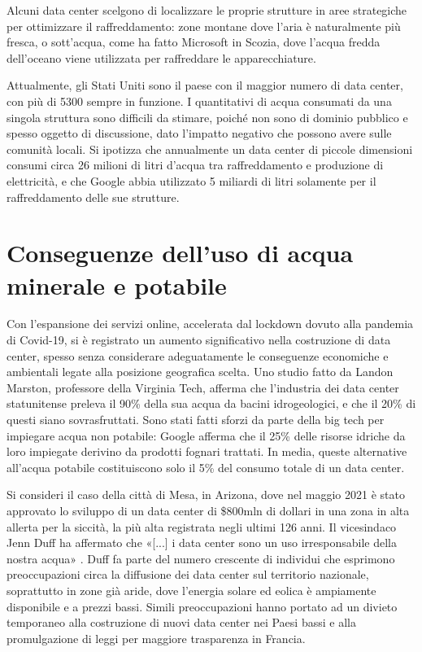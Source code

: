 \documentclass[12pt,a4paper,oneside]{book}
\begin{document}
Alcuni data center scelgono di localizzare le proprie strutture in aree strategiche per ottimizzare il raffreddamento: zone montane dove l'aria è naturalmente più fresca, o sott'acqua, come ha fatto Microsoft in Scozia, dove l'acqua fredda dell'oceano viene utilizzata per raffreddare le apparecchiature.

Attualmente, gli Stati Uniti sono il paese con il maggior numero di data center, con più di 5300 sempre in funzione. I quantitativi di acqua consumati da una singola struttura sono difficili da stimare, poiché non sono di dominio pubblico e spesso oggetto di discussione, dato l'impatto negativo che possono avere sulle comunità locali. Si ipotizza che annualmente un data center di piccole dimensioni consumi circa 26 milioni di litri d'acqua tra raffreddamento e produzione di elettricità, e che Google abbia utilizzato 5 miliardi di litri solamente per il raffreddamento delle sue strutture.

\section{Conseguenze dell'uso di acqua minerale e potabile}

Con l'espansione dei servizi online, accelerata dal lockdown dovuto alla pandemia di Covid-19, si è registrato un aumento significativo nella costruzione di data center, spesso senza considerare adeguatamente le conseguenze economiche e ambientali legate alla posizione geografica scelta.
Uno studio fatto da Landon Marston, professore della Virginia Tech, afferma che l'industria dei data center statunitense preleva il 90\% della sua acqua da bacini idrogeologici, e che il 20\% di questi siano sovrasfruttati. Sono stati fatti sforzi da parte della big tech per impiegare acqua non potabile: Google afferma che il 25\% delle risorse idriche da loro impiegate derivino da prodotti fognari trattati. In media, queste alternative all'acqua potabile costituiscono solo il 5\% del consumo totale di un data center.

Si consideri il caso della città di Mesa, in Arizona, dove nel maggio 2021 è stato approvato lo sviluppo di un data center di \$800mln di dollari in una zona in alta allerta per la siccità, la più alta registrata negli ultimi 126 anni. Il vicesindaco Jenn Duff ha affermato che «[...] i data center sono un uso irresponsabile della nostra acqua» \cite{nbc2021drought}. Duff fa parte del numero crescente di individui che esprimono preoccupazioni circa la diffusione dei data center sul territorio nazionale, soprattutto in zone già aride, dove l'energia solare ed eolica è ampiamente disponibile e a prezzi bassi.
Simili preoccupazioni hanno portato ad un divieto temporaneo alla costruzione di nuovi data center nei Paesi bassi e alla promulgazione di leggi per maggiore trasparenza in Francia.
\end{document}
